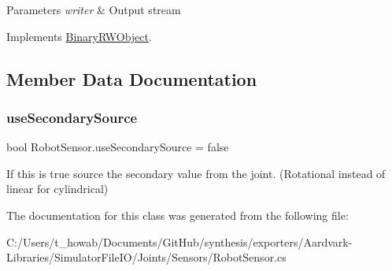 \begin{DoxyParams}{Parameters}
{\em writer} & Output stream\\
\hline
\end{DoxyParams}


Implements \hyperlink{interface_binary_r_w_object_a5e361e550b30dcd29759188cf67d177c}{Binary\+R\+W\+Object}.



\subsection{Member Data Documentation}
\mbox{\label{class_robot_sensor_ad6c16b11683315a18bd63117384d3692}} 
\subsubsection{\texorpdfstring{use\+Secondary\+Source}{useSecondarySource}}
{\footnotesize\ttfamily bool Robot\+Sensor.\+use\+Secondary\+Source = false}



If this is true source the secondary value from the joint. (Rotational instead of linear for cylindrical) 



The documentation for this class was generated from the following file\+:\begin{DoxyCompactItemize}
\item 
C\+:/\+Users/t\+\_\+howab/\+Documents/\+Git\+Hub/synthesis/exporters/\+Aardvark-\/\+Libraries/\+Simulator\+File\+I\+O/\+Joints/\+Sensors/Robot\+Sensor.\+cs\end{DoxyCompactItemize}
